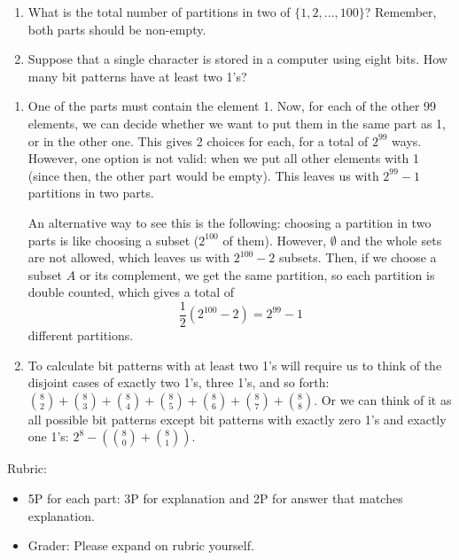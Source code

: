 \documentclass{article}
\theoremstyle{definition}
\begin{document}
\begin{question}
    \begin{enumerate}
   	\item What is the total number of partitions in two of $\{1, 2, \dots, 100 \}$? 
	Remember, both parts should be non-empty.
        \item Suppose that a single character is stored in a computer using eight bits. 
        How many bit patterns have at least two 1's?
   	\end{enumerate}
\end{question}
\begin{solution}
    	\begin{enumerate}

   	 \item One of the parts must contain the element 1. Now, for each of the other 99 elements, we can decide whether we want to put them in the same part as 1, or in the other one. This gives 2 choices for each, for a total of $2^{99}$ ways. However, one option is not valid: when we put all other elements with 1 (since then, the other part would be empty). This leaves us with $2^{99} - 1$ partitions in two parts.
	
	An alternative way to see this is the following: choosing a partition in two parts is like choosing a subset ($2^{100}$ of them). However, $\emptyset$ and the whole sets are not allowed, which leaves us with $2^{100} - 2$ subsets. Then, if we choose a subset $A$ or its complement, we get the same partition, so each partition is double counted, which gives a total of
	\[
	\frac12 \left ( 2^{100} - 2 \right ) = 2^{99} - 1
	\]
	different partitions.


        \item To calculate bit patterns with at least two 1's will require us to think of the disjoint cases of exactly two 1's, three 1's, and so forth: $\binom{8}{2} + \binom{8}{3} + \binom{8}{4} + \binom{8}{5} + \binom{8}{6} + \binom{8}{7} + \binom{8}{8} $. Or we can think of it as all possible bit patterns except bit patterns with exactly zero 1's and exactly one 1's: $2^8 - \left(\binom{8}{0}+\binom{8}{1}\right)$.
        
   	\end{enumerate}
 {\color{red} Rubric:
\begin{itemize}
\item 5P for each part: 3P for explanation and 2P for answer that matches explanation.
\item Grader: Please expand on rubric yourself.
\end{itemize}}
\end{solution}
\end{document}
